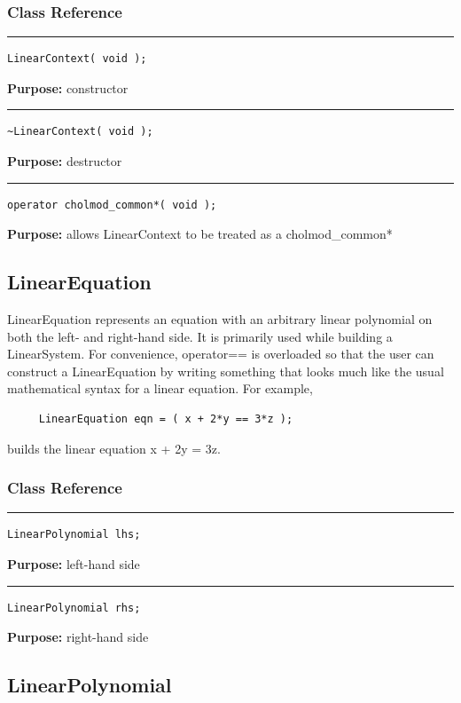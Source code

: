 \documentclass{article}
\begin{document}
\subsubsection{Class Reference}

\rule{5in}{1pt}
\begin{verbatim}
LinearContext( void );
\end{verbatim}
\textbf{Purpose:}
constructor

\hspace{-.21in}\rule{5in}{1pt}
\begin{verbatim}
~LinearContext( void );
\end{verbatim}
\textbf{Purpose:}
destructor

\hspace{-.21in}\rule{5in}{1pt}
\begin{verbatim}
operator cholmod_common*( void );
\end{verbatim}
\textbf{Purpose:}
allows LinearContext to be treated as a cholmod\_common*

\pagebreak\subsection{LinearEquation}

 

 LinearEquation represents an equation with an arbitrary linear polynomial on both the left- and right-hand side.  It is primarily used while building a LinearSystem.  For convenience, operator== is overloaded so that the user can construct a LinearEquation by writing something that looks much like the usual mathematical syntax for a linear equation.  For example, 

 \begin{verbatim}
     LinearEquation eqn = ( x + 2*y == 3*z );
 \end{verbatim}
\vspace{-\baselineskip} builds the linear equation x + 2y = 3z. 



\subsubsection{Class Reference}

\rule{5in}{1pt}
\begin{verbatim}
LinearPolynomial lhs;
\end{verbatim}
\textbf{Purpose:}
left-hand side

\hspace{-.21in}\rule{5in}{1pt}
\begin{verbatim}
LinearPolynomial rhs;
\end{verbatim}
\textbf{Purpose:}
right-hand side
\pagebreak\subsection{LinearPolynomial}
\end{document}
